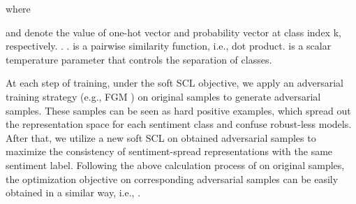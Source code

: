 \documentclass[11pt]{article}
\begin{document}
where 
   

 and  denote the value of one-hot vector  and probability vector  at class index k, respectively.
. 
.
 is a pairwise similarity function, 
i.e., dot product.
 is a scalar temperature parameter that controls the separation of classes. 

\begin{table*}[t]
\centering
{}
\caption{
Comparison of our SACL-XLMR with other PTMs. \# Param. refers to the total number of parameters for each model excluding the task-specific classifier. 
\# Vocab. represents the size of vocabulary. 
\# Lang. indicates the number of language coverage. 
Seen/Unseen Lang. Adapt. represents whether the model supports seen/unseen target language adaptation. 
We list the languages covered by both the pre-trained corpus and AfriSent datasets.
}
\label{tab:language}
\end{table*}

At each step of training, under the soft SCL objective, we apply an adversarial training strategy (e.g., FGM \citep{DBLP:conf/iclr/MiyatoDG17}) on original samples to generate adversarial samples.
These samples can be seen as hard positive examples, which spread out the representation space for each sentiment class and confuse robust-less models.
After that, we utilize a new soft SCL on obtained adversarial samples to maximize the consistency of sentiment-spread representations with the same sentiment label.
Following the above calculation process 
of  
on original samples, the optimization objective on corresponding adversarial samples can be easily obtained in a similar way, i.e., .
\end{document}

